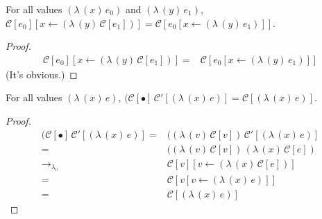 \documentclass[ms,electronic,twosidetoc,letterpaper,chaptercenter,parttop]{byumsphd}
\begin{document}
\begin{lemma}
For all values $(\lambda\,(x)\,e_0)$ and $(\lambda\,(y)\,e_1)$, $\mathcal{C}[e_0][x\leftarrow (\lambda\,(y)\,\mathcal{C}[e_1])]=\mathcal{C}[e_0[x\leftarrow (\lambda\,(y)\,e_1)]]$.
\end{lemma}

\begin{proof}
\begin{align*}
\mathcal{C}[e_0][x\leftarrow (\lambda\,(y)\,\mathcal{C}[e_1])] = &\mathcal{C}[e_0[x\leftarrow (\lambda\,(y)\,e_1)]]
\end{align*}
(It's obvious.)
\end{proof}

\begin{lemma}
For all values $(\lambda\,(x)\,e)$, $(\mathcal{C}[\bullet]\,\mathcal{C}'[(\lambda\,(x)\,e)]=\mathcal{C}[(\lambda\,(x)\,e)]$.
\end{lemma}

\begin{proof}
\begin{align*}
(\mathcal{C}[\bullet]\,\mathcal{C}'[(\lambda\,(x)\,e)] = &((\lambda\,(v)\,\mathcal{C}[v])\,\mathcal{C}'[(\lambda\,(x)\,e)]\\
                                                       = &((\lambda\,(v)\,\mathcal{C}[v])\,(\lambda\,(x)\,\mathcal{C}[e])\\
                                 \rightarrow_{\lambda_v} &\mathcal{C}[v][v\leftarrow (\lambda\,(x)\,\mathcal{C}[e])]\\
                                                       = &\mathcal{C}[v[v\leftarrow (\lambda\,(x)\,e)]]\\
                                                       = &\mathcal{C}[(\lambda\,(x)\,e)]
\end{align*}
\end{proof}




\end{document}
